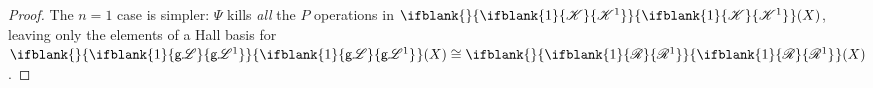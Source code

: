 \documentclass[10pt]{article}
\newcommand{\GoodLie}[1]%
{\ifblank{#1}{\mathsf{g}{\scrL}}{\mathsf{g}{\scrL}^{#1}}}
\newcommand{\PRLie}[1]%
{\ifblank{#1}{\scrR}{\scrR^{#1}}}
\newcommand{\LL}[1]{\ifblank{#1}{\scrK}{\scrK^{#1}}}
\newcommand{\nontop}[1]{\ifblank{#1}{\scrU}{\scrU^{#1}}}
\newcommand{\Ind}[2][]{\ifblank{#1}{\mathbf{I}^{\smash{\mbox{\tiny $#2$}}}}{\mathbf{I}^{\mbox{\tiny $#2$}}_{#1}}}%
\newcommand{\Fr}[2][]{\ifblank{#1}{#2}{#2_{#1}}}
\newcommand{\restn}[2][]{\ifblank{#1}{\xi{#2}}{\xi_{#1}{#2}}}%
\renewcommand{\Q}{Q}
\begin{document}
\begin{DiagramOfFunctors}
\begin{proof}
The $n=1$ case is simpler: $\Psi$ kills \emph{all} the $P$ operations in $\Fr{\LL{1}}(X)$, leaving only the elements of a Hall basis for $\Fr{\GoodLie{1}}(X)\cong \Fr{\PRLie{1}}(X)$.
\end{proof}

%
%
\end{DiagramOfFunctors}
\end{document}
